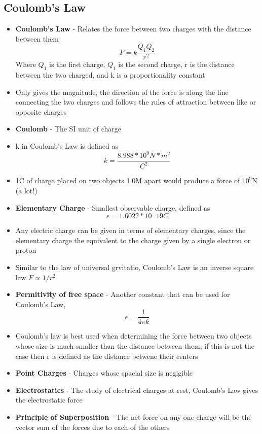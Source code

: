 \subsection{Coulomb's Law}
\begin{itemize}
    \item \textbf{Coulomb's Law} - Relates the force between two charges with the distance between them \[F=k\frac{Q_1Q_2}{r^2}\] Where \(Q_1\) is the first charge, \(Q_1\) is the second charge, r is the distance between the two charged, and k is a proportionality constant
    \item Only gives the magnitude, the direction of the force is along the line connecting the two charges and follows the rules of attraction between like or opposite charges
    \item \textbf{Coulomb} - The SI unit of charge
    \item k in Coulomb's Law is defined as \[k=\frac{8.988*10^9N*m^2}{C^2}\]
    \item 1C of charge placed on two objects 1.0M apart would produce a force of \(10^9\)N (a lot!) 
    \item \textbf{Elementary Charge} - Smallest observable charge, defined as \[e=1.6022*10^-19C\]
    \item Any electric charge can be given in terms of elementary charges, since the elementary charge the equivalent to the charge given by a single electron or proton
    \item Similar to the law of universal grvitatio, Coulomb's Law is an inverse square law \(F\propto 1/r^2\)
    \item \textbf{Permitivity of free space} - Another constant that can be used for Coulomb's Law, \[\epsilon=\frac{1}{4\pi k}\]
    \item Coulomb's law is best used when determining the force between two objects whose size is much smaller than the distance between them, if this is not the case then r is defined as the distance betwene their centers
    \item \textbf{Point Charges} - Charges whose spacial size is negigible
    \item \textbf{Electrostatics} - The study of electrical charges at rest, Coulomb's Law gives the electrostatic force
    \item \textbf{Principle of Superposition} - The net force on any one charge will be the vector sum of the forces due to each of the others
\end{itemize}

